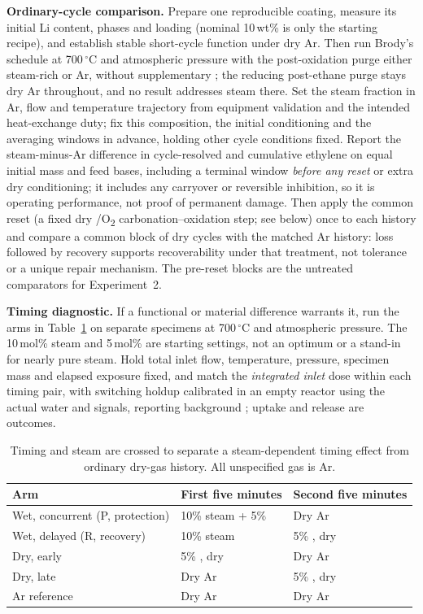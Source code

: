 \textbf{Ordinary-cycle comparison.} Prepare one reproducible coating, measure its initial Li content, phases and loading (nominal 10\,wt\% is only the starting recipe), and establish stable short-cycle function under dry Ar. Then run Brody's schedule at 700\,$^\circ$C and atmospheric pressure with the post-oxidation purge either steam-rich or Ar, without supplementary \COtwo{}; the reducing post-ethane purge stays dry Ar throughout, and no result addresses steam there. Set the steam fraction in Ar, flow and temperature trajectory from equipment validation and the intended heat-exchange duty; fix this composition, the initial conditioning and the averaging windows in advance, holding other cycle conditions fixed. Report the steam-minus-Ar difference in cycle-resolved and cumulative ethylene on equal initial mass and feed bases, including a terminal window \emph{before any reset} or extra dry conditioning; it includes any carryover or reversible inhibition, so it is operating performance, not proof of permanent damage. Then apply the common reset (a fixed dry \COtwo{}/O\textsubscript{2} carbonation--oxidation step; see below) once to each history and compare a common block of dry cycles with the matched Ar history: loss followed by recovery supports recoverability under that treatment, not tolerance or a unique repair mechanism. The pre-reset blocks are the untreated comparators for Experiment~2.

\textbf{Timing diagnostic.} If a functional or material difference warrants it, run the arms in Table~\ref{tab:cyclic-timing} on separate specimens at 700\,$^\circ$C and atmospheric pressure. The 10\,mol\% steam and 5\,mol\% \COtwo{} are starting settings, not an optimum or a stand-in for nearly pure steam. Hold total inlet flow, temperature, pressure, specimen mass and elapsed exposure fixed, and match the \emph{integrated inlet} \COtwo{} dose within each timing pair, with switching holdup calibrated in an empty reactor using the actual water and \COtwo{} signals, reporting background \COtwo{}; uptake and release are outcomes.

\begin{table}[ht]
\centering
\caption{Timing and steam are crossed to separate a steam-dependent timing effect from ordinary dry-gas history. All unspecified gas is Ar.}
\label{tab:cyclic-timing}
\begin{tabularx}{\linewidth}{@{}lXX@{}}
\toprule
Arm & First five minutes & Second five minutes\\
\midrule
Wet, concurrent (P, protection) & 10\% steam + 5\% \COtwo{} & Dry Ar\\
Wet, delayed (R, recovery) & 10\% steam & 5\% \COtwo{}, dry\\
Dry, early \COtwo{} & 5\% \COtwo{}, dry & Dry Ar\\
Dry, late \COtwo{} & Dry Ar & 5\% \COtwo{}, dry\\
Ar reference & Dry Ar & Dry Ar\\
\bottomrule
\end{tabularx}
\end{table}

